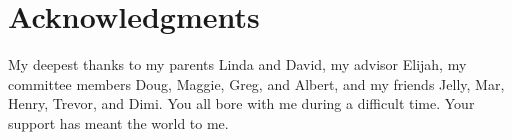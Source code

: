 \chapter*{Acknowledgments}

My deepest thanks to my parents Linda and David, my advisor Elijah, my committee members Doug, Maggie, Greg, and Albert, and my friends Jelly, Mar, Henry, Trevor, and Dimi. You all bore with me during a difficult time. Your support has meant the world to me.
